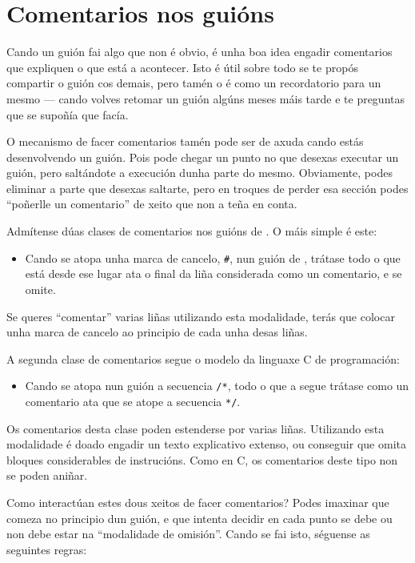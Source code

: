 \chapter{Comentarios nos guións}
\label{chap:comments}

Cando un guión fai algo que non é obvio, é unha boa idea engadir
comentarios que expliquen o que está a acontecer. Isto é útil sobre
todo se te propós compartir o guión cos demais, pero tamén o é
como un recordatorio para un mesmo --- cando volves retomar un guión
algúns meses máis tarde e te preguntas que se supoñía que facía.

O mecanismo de facer comentarios tamén pode ser de axuda cando estás
desenvolvendo un guión. Pois pode chegar un punto no que desexas
executar un guión, pero saltándote a execución dunha parte do mesmo.
Obviamente, podes eliminar a parte que desexas saltarte, pero en troques
de perder esa sección podes ``poñerlle un comentario'' de xeito que
 non a teña en conta.

Admítense dúas clases de comentarios nos guións de .
O máis simple é este:

\begin{itemize}
\item Cando se atopa unha marca de cancelo, \texttt{\#}, nun guión de
  , trátase todo o que está desde ese lugar ata o final da
  liña considerada como un comentario, e se omite.
\end{itemize}

Se queres ``comentar'' varias liñas utilizando esta modalidade, terás
que colocar unha marca de cancelo ao principio de cada unha desas liñas.

A segunda clase de comentarios segue o modelo da linguaxe C de programación:

\begin{itemize}
\item Cando se atopa nun guión a secuencia \texttt{/*}, todo o que a
  segue trátase como un comentario ata que se atope a secuencia
  \texttt{*/}.
\end{itemize}

Os comentarios desta clase poden estenderse por varias liñas. Utilizando
esta modalidade é doado engadir un texto explicativo extenso, ou conseguir
que  omita bloques considerables de instrucións. Como en C,
os comentarios deste tipo non se poden aniñar.

Como interactúan estes dous xeitos de facer comentarios? Podes imaxinar
que  comeza no principio dun guión, e que intenta decidir en
cada punto se debe ou non debe estar na ``modalidade de omisión''. Cando
se fai isto, séguense as seguintes regras:


